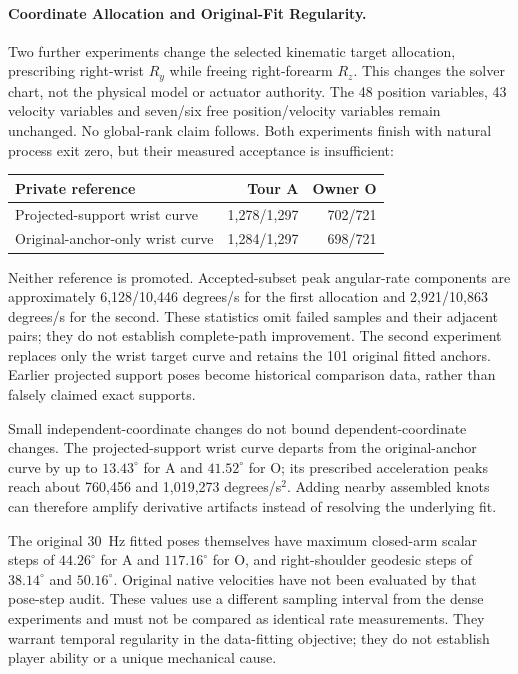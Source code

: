 \documentclass[11pt,a4paper]{article}
\begin{document}
\paragraph{Coordinate Allocation and Original-Fit Regularity.}
Two further experiments change the selected kinematic target allocation,
prescribing right-wrist \(R_y\) while freeing right-forearm \(R_z\).
This changes the solver chart, not the physical model or actuator authority.
The 48 position variables, 43 velocity variables and seven/six free
position/velocity variables remain unchanged. No global-rank claim follows.
Both experiments finish with natural process exit zero, but their measured
acceptance is insufficient:
\begin{center}
\begin{tabular}{lrr}
\toprule
Private reference & Tour A & Owner O \\
\midrule
Projected-support wrist curve & 1,278/1,297 & 702/721 \\
Original-anchor-only wrist curve & 1,284/1,297 & 698/721 \\
\bottomrule
\end{tabular}
\end{center}
Neither reference is promoted. Accepted-subset peak angular-rate components
are approximately 6,128/10,446 degrees/s for the first allocation and
2,921/10,863 degrees/s for the second. These statistics omit failed samples
and their adjacent pairs; they do not establish complete-path improvement.
The second experiment replaces only the wrist target curve and retains the
101 original fitted anchors. Earlier projected support poses become
historical comparison data, rather than falsely claimed exact supports.

Small independent-coordinate changes do not bound dependent-coordinate
changes. The projected-support wrist curve departs from the original-anchor
curve by up to \(13.43^{\circ}\) for A and \(41.52^{\circ}\) for O;
its prescribed acceleration peaks reach about 760,456 and 1,019,273
degrees/s\(^{2}\). Adding nearby assembled knots can therefore amplify
derivative artifacts instead of resolving the underlying fit.

The original 30~Hz fitted poses themselves have maximum closed-arm scalar
steps of \(44.26^{\circ}\) for A and \(117.16^{\circ}\) for O, and
right-shoulder geodesic steps of \(38.14^{\circ}\) and \(50.16^{\circ}\).
Original native velocities have not been evaluated by that pose-step audit.
These values use a different sampling interval from the dense experiments
and must not be compared as identical rate measurements. They warrant
temporal regularity in the data-fitting objective; they do not establish
player ability or a unique mechanical cause.
\end{document}
